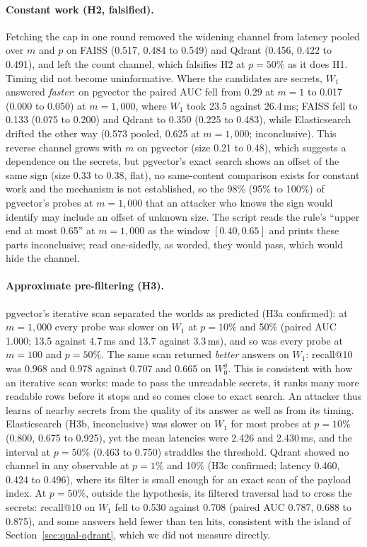 \paragraph{Constant work (H2, falsified).}
Fetching the cap in one round removed the widening channel from latency pooled over $m$ and $p$ on
FAISS (0.517, 0.484 to 0.549) and Qdrant (0.456, 0.422 to 0.491), and left the count channel, which
falsifies H2 at $p = 50\%$ as it does H1. Timing did not become uninformative. Where the candidates
are secrets, $W_1$ answered \emph{faster}: on pgvector the paired AUC fell from 0.29 at $m = 1$ to 0.017
(0.000 to 0.050) at $m = 1{,}000$, where $W_1$ took 23.5 against 26.4\,ms; FAISS fell to 0.133 (0.075
to 0.200) and Qdrant to 0.350 (0.225 to 0.483), while Elasticsearch drifted the other way (0.573
pooled, 0.625 at $m = 1{,}000$; inconclusive). This reverse channel grows with $m$ on pgvector (size 0.21 to 0.48), which suggests a dependence
on the secrets, but pgvector's exact search shows an offset of the same sign (size 0.33 to 0.38, flat), no same-content comparison exists for constant work and the mechanism is not established, so the 98\% (95\% to 100\%) of pgvector's probes at
$m = 1{,}000$ that an attacker who knows the sign would identify may include an offset of unknown size. The script reads the rule's ``upper end at most 0.65'' at $m = 1{,}000$ as the window
$[0.40, 0.65]$ and prints these parts inconclusive; read one-sidedly, as worded, they would pass,
which would hide the channel.

\paragraph{Approximate pre-filtering (H3).}
pgvector's iterative scan separated the worlds as predicted (H3a confirmed): at $m = 1{,}000$ every probe was slower
on $W_1$ at $p = 10\%$ and 50\% (paired AUC 1.000; 13.5 against 4.7\,ms and 13.7 against 3.3\,ms), and so
was every probe at $m = 100$ and $p = 50\%$. The same scan returned \emph{better} answers on $W_1$:
recall@10 was 0.968 and 0.978 against 0.707 and 0.665 on $W_0^g$. This is consistent with how an iterative scan
works: made to pass the unreadable secrets, it ranks many more readable rows before it stops and so
comes close to exact search. An attacker thus learns of nearby secrets from the quality of its answer
as well as from its timing.
Elasticsearch (H3b, inconclusive) was slower on $W_1$ for most probes at $p = 10\%$ (0.800, 0.675 to
0.925), yet the mean latencies were 2.426 and 2.430\,ms, and the interval at $p = 50\%$ (0.463 to
0.750) straddles the threshold. Qdrant showed no channel in any observable at $p = 1\%$ and 10\% (H3c
confirmed; latency 0.460, 0.424 to 0.496), where its filter is small enough for an exact scan of the
payload index. At $p = 50\%$, outside the hypothesis, its filtered traversal had to cross the secrets:
recall@10 on $W_1$ fell to 0.530 against 0.708 (paired AUC 0.787, 0.688 to 0.875), and some answers
held fewer than ten hits, consistent with the island of Section~\ref{sec:qual-qdrant}, which we did not measure directly.


